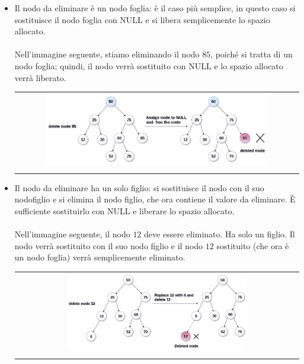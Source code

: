 \begin{itemize}
    \item Il nodo da eliminare è un nodo foglia: è il caso più semplice, in questo caso si sostituisce il nodo foglia con NULL e si libera semplicemente lo spazio allocato. \\~\\
    Nell'immagine seguente, stiamo eliminando il nodo $85$, poiché si tratta di un nodo foglia; quindi, il nodo verrà sostituito con NULL e lo spazio allocato verrà liberato.
    \begin{center}
        \begin{tabular}{c}
            \\ \includegraphics[width=0.8\textwidth]{image/Cancellazione1.png} \\ \\
        \end{tabular}
    \end{center}
    \item Il nodo da eliminare ha un solo figlio: si sostituisce il nodo con il suo nodofiglio e si elimina il nodo figlio, che ora contiene il valore da eliminare. È sufficiente sostituirlo con NULL e liberare lo spazio allocato. \\~\\
    Nell'immagine seguente, il nodo $12$ deve essere eliminato. Ha solo un figlio. Il nodo verrà sostituito con il suo nodo figlio e il nodo $12$ sostituito (che ora è un nodo foglia) verrà semplicemente eliminato.
    \begin{center}
        \begin{tabular}{c}
            \\ \includegraphics[width=0.65\textwidth]{image/Cancellazione2.png} \\ \\

\end{tabular}
\end{center}
\end{itemize}

